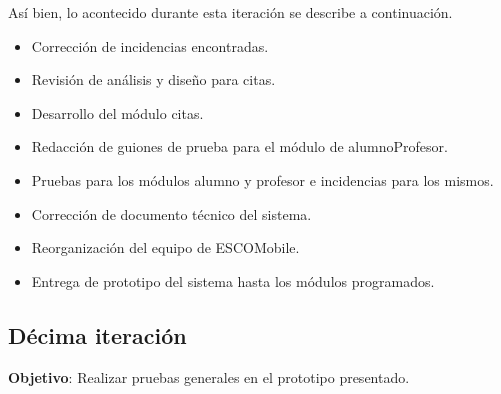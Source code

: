 \newline
Así bien, lo acontecido durante esta iteración se describe a continuación. 
\begin{itemize}
	\item Corrección de incidencias encontradas.
	\item Revisión de análisis y diseño para citas.
	\item Desarrollo del módulo citas.
	\item Redacción de guiones de prueba para el módulo de alumnoProfesor.
	\item Pruebas para los módulos alumno y profesor e incidencias para los mismos.
	\item Corrección de documento técnico del sistema.
	\item Reorganización del equipo de ESCOMobile.
	\item Entrega de prototipo del sistema hasta los módulos programados.
\end{itemize}


\subsection{Décima iteración}

\noindent
\textbf{Objetivo}: Realizar pruebas generales en el prototipo presentado.
\newline

